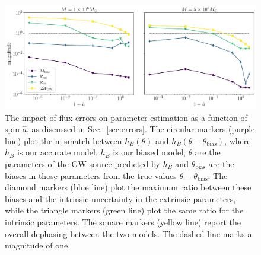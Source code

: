 \documentclass[%
 reprint,
 nofootinbib,
 amsmath,amssymb,
 aps,
 prd,
]{revtex4-2}
\begin{document}
\begin{figure}[!htp]
    \centering
    \includegraphics[width=0.98\linewidth]{figures/flux_error.pdf}
    \caption{The impact of flux errors on parameter estimation as a function of spin $\hat{a}$, as discussed in Sec.~\ref{sec:errors}. The circular markers (purple line) plot the mismatch between $h_E(\theta)$ and $h_B(\theta-\theta_\mathrm{bias})$, where $h_B$ is our accurate model, $h_E$ is our biased model, $\theta$ are the parameters of the GW source predicted by $h_B$ and $\theta_\mathrm{bias}$ are the biases in those parameters from the true values $\theta-\theta_\mathrm{bias}$. The diamond markers (blue line) plot the maximum ratio between these biases and the intrinsic uncertainty in the extrinsic parameters, while the triangle markers (green line) plot the same ratio for the intrinsic parameters. The square markers (yellow line) report the overall dephasing between the two models. The dashed line marks a magnitude of one.}
    \label{fig:errorBiases}
\end{figure}
\end{document}
